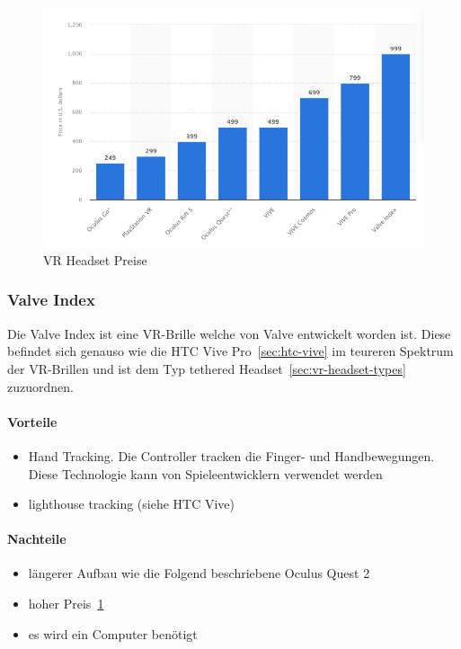 \begin{figure}
    \centering
    \includegraphics[scale=0.5]{pics/vr_headset_price_statistic}
    \caption{VR Headset Preise~\cite{ALSOP_2019}}
    \label{fig:vr_headset_prices}
\end{figure}

\subsubsection{Valve Index}

Die Valve Index ist eine VR-Brille welche von Valve entwickelt worden ist.
Diese befindet sich genauso wie die HTC Vive Pro~\ref{sec:htc-vive} im teureren Spektrum~\cite{ALSOP_2019} der VR-Brillen und ist dem Typ tethered Headset~\ref{sec:vr-headset-types} zuzuordnen.

\paragraph{Vorteile}

\begin{itemize}
    \item Hand Tracking.
    Die Controller tracken die Finger- und Handbewegungen.
    Diese Technologie kann von Spieleentwicklern verwendet werden~\cite{SadlyItsBradley_2019}
    \item lighthouse tracking (siehe HTC Vive)
\end{itemize}

\paragraph{Nachteile}

\begin{itemize}
    \item längerer Aufbau wie die Folgend beschriebene Oculus Quest 2
    \item hoher Preis~\ref{fig:vr_headset_prices}
    \item es wird ein Computer benötigt
\end{itemize}

